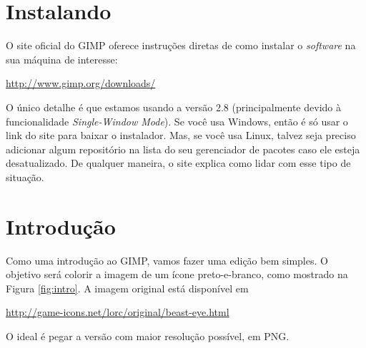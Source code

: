 \documentclass[12pt,onecolumn]{article}
\begin{document}
\clearpage
\section{Instalando}
  O site oficial do GIMP oferece instruções diretas de como instalar o {\it
  software} na sua máquina de interesse:
  
  \begin{center}
    \url{http://www.gimp.org/downloads/}
  \end{center}
  
  O único detalhe é que estamos usando a versão 2.8 (principalmente devido à
  funcionalidade {\it Single-Window Mode}). Se você usa Windows, então é só
  usar o link do site para baixar o instalador. Mas, se você usa Linux, talvez
  seja preciso adicionar algum repositório na lista do seu gerenciador de 
  pacotes caso ele esteja desatualizado. De qualquer maneira, o site explica
  como lidar com esse tipo de situação.

\clearpage
\section{Introdução}
  Como uma introdução ao GIMP, vamos fazer uma edição bem simples. O objetivo
  será colorir a imagem de um ícone preto-e-branco, como mostrado na Figura
  \ref{fig:intro}. A imagem original está disponível em
  
  \begin{center}
    \url{http://game-icons.net/lorc/original/beast-eye.html}      
  \end{center}
  
   O ideal é pegar a versão com maior resolução possível, em PNG.
\end{document}

